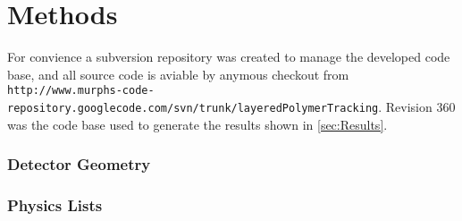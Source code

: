 \section{Methods}
\label{sec:Methods}


For convience a subversion repository was created to manage the developed code base, and all source code is aviable by anymous checkout from \verb+http://www.murphs-code-repository.googlecode.com/svn/trunk/layeredPolymerTracking+. Revision 360 was the code base used to generate the results shown in \ref{sec:Results}.

\subsubsection{Detector Geometry}

\subsubsection{Physics Lists}
